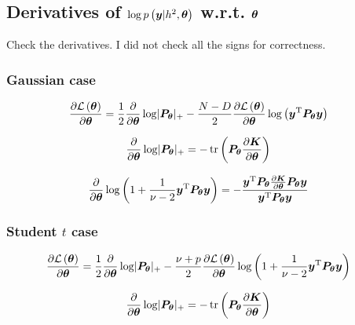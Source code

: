 \documentclass[twoside]{article}
\newcommand{\Pt}{\B{P}_{\B{\theta}}}
\newcommand{\TODO}[1]{{\color{MyRed}\fbox{TODO} #1}}
\begin{document}
\subsection{Derivatives of $\operatorname{log} p\left(\bm{y}| h^2, \bm{\theta}\right)$ w.r.t. $\bm{\theta}$}
\TODO{Check the derivatives. I did not check all the signs for correctness.}



\subsubsection{Gaussian case}
\begin{align}
     \frac{\partial\lik{\B{\theta}}}{\partial \B{\theta}}
     &=
    \frac{1}{2} \frac{\partial}{\partial \B{\theta}}\logt \lvert \Pt \rvert_{+}
      -\frac{N-D}{2} \frac{\partial\lik{\B{\theta}}}{\partial \B{\theta}} \logt\left(\B{y}\transpose\Pt\B{y}\right)
\end{align}

\begin{align}
    \frac{\partial}{\partial \B{\theta}}\logt \lvert \Pt \rvert_{+}     &=
    -\tr\left(\Pt \frac{\partial \B{K}}{\partial \B{\theta}} \right)
\end{align}

\begin{align}
    \frac{\partial}{\partial \B{\theta}} \logt\left(1 + \frac{1}{\nu-2}\B{y}\transpose\Pt\B{y}\right)     &=
   - \frac{\B{y}\tp\Pt \frac{\partial \B{K}}{\partial \B{\theta}}\Pt\B{y}}{\B{y}\transpose\Pt\B{y}}
\end{align}


\subsubsection{Student $t$ case}

\begin{align}
     \frac{\partial\lik{\B{\theta}}}{\partial \B{\theta}}
     &=
    \frac{1}{2} \frac{\partial}{\partial \B{\theta}}\logt \lvert \Pt \rvert_{+}
      -\frac{\nu+p}{2} \frac{\partial\lik{\B{\theta}}}{\partial \B{\theta}} \logt\left(1 + \frac{1}{\nu-2}\B{y}\transpose\Pt\B{y}\right)
\end{align}

\begin{align}
    \frac{\partial}{\partial \B{\theta}}\logt \lvert \Pt \rvert_{+}     &=
    -\tr\left(\Pt \frac{\partial \B{K}}{\partial \B{\theta}} \right)
\end{align}
\end{document}
